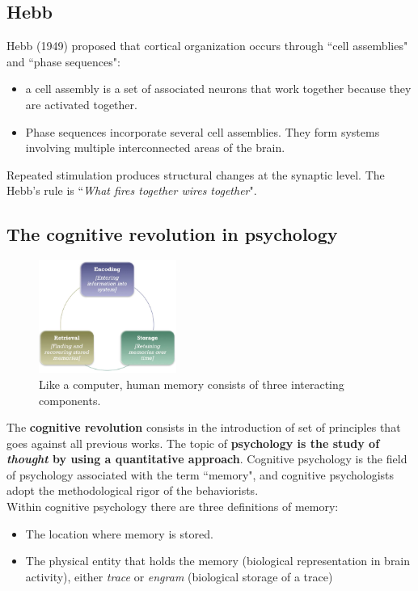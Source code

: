 
\subsection{Hebb}
Hebb (1949) proposed that cortical organization occurs through ``cell assemblies" and ``phase sequences":
\begin{itemize}
    \item a cell assembly is a set of associated neurons that work together because they are activated together.
    \item Phase sequences incorporate several cell assemblies. They form systems involving multiple interconnected areas of the brain.
\end{itemize}
Repeated stimulation produces structural changes at the synaptic level. The Hebb's rule is ``\textit{What fires together wires together}".

\subsection{The cognitive revolution in psychology}
\begin{figure}
  \centering
  \includegraphics[width=0.4\textwidth]{images/metaphor.png}
  \caption{Like a computer, human memory consists of three interacting components.}
  \label{fig:metaphor}
\end{figure}
The \textbf{cognitive revolution} consists in the introduction of set of principles that goes against all previous works.
The topic of \textbf{psychology is the study of \textit{thought} by using a quantitative approach}.
Cognitive psychology is the field of psychology associated with the term ``memory", and cognitive psychologists adopt the methodological rigor of the behaviorists.\\

Within cognitive psychology there are three definitions of memory:
\begin{itemize}
    \item The location where memory is stored.
    \item The physical entity that holds the memory (biological representation in brain activity), either \textit{trace} or \textit{engram} (biological storage of a trace)
\end{itemize}

